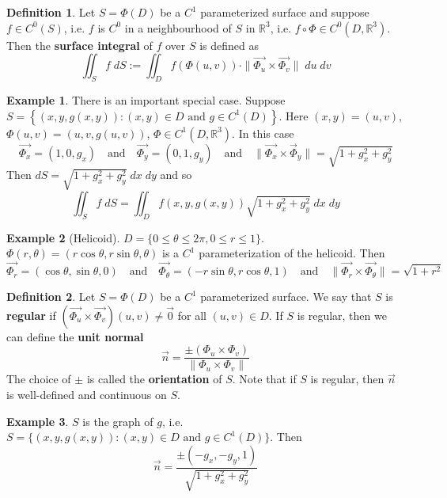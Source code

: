 \documentclass[11pt]{article}
\theoremstyle{definition}
\newtheorem{exmp}{Example}[section]
\theoremstyle{definition}
\newcommand{\R}[0]{\mathbb{R}}
\theoremstyle{definition}
\newtheorem{definition}{\textcolor{OliveGreen}{Definition}}
\theoremstyle{remark}
\begin{document}
\begin{definition}
    Let $S = \Phi(D)$ be a $C^1$ parameterized surface and suppose $f \in C^0(S)$, i.e. $f$ is $C^0$ in a neighbourhood of $S$ in $\R^3$, i.e. $f \circ \Phi \in C^0(D, \R^3)$.
    Then the \textbf{surface integral} of $f$ over $S$ is defined as
    \[
        \iint_S f \; dS := \iint_{D} f(\Phi(u,v)) \cdot \| \vec{\Phi_u} \times \vec{\Phi_v} \| \; du \; dv
    \]        
\end{definition}

\begin{exmp}
    There is an important special case. Suppose $S = \left\{ (x, y, g(x,y)) : (x,y) \in D \text{ and } g \in C^1(D) \right\} $.
    Here $(x,y) = (u,v)$, $\Phi(u,v) = (u, v, g(u,v))$, $\Phi \in C^1(D, \R^3)$. In this case
    \[
        \vec{\Phi_x} = (1, 0, g_x) \quad \text{and} \quad \vec{\Phi_y} = (0, 1, g_y) \quad \text{and} \quad \| \vec{\Phi_x} \times \vec{\Phi}_y \| = \sqrt{1 + g_x^2 + g_y^2} 
    \]    
    Then $dS = \sqrt{1 + g_x^2 + g_y^2} \; dx \; dy$ and so
    \[
        \iint_S f \; dS = \iint_D f(x, y, g(x,y)) \sqrt{1 + g_x^2 + g_y^2} \; dx \; dy
    \] 
\end{exmp}

\begin{exmp}[Helicoid]
    $D = \{0 \leq \theta \leq 2 \pi , 0 \leq r \leq 1\}$. $\Phi(r, \theta) = (r \cos \theta, r \sin \theta, \theta)$ is a $C^1$ parameterization of the helicoid. Then
    \[
        \vec{\Phi_r} = (\cos \theta, \sin \theta, 0) \quad \text{and} \quad \vec{\Phi_\theta} = (-r \sin \theta, r \cos \theta, 1) \quad \text{and} \quad \| \vec{\Phi_r} \times \vec{\Phi_\theta} \| = \sqrt{1 + r^2}
    \] 
\end{exmp}

\begin{definition}
    Let $S = \Phi(D)$ be a $C^1$ parameterized surface. We say that $S$ is \textbf{regular} if $(\vec{\Phi_u} \times \vec{\Phi_v})(u,v) \neq \vec{0}$ for all $(u,v) \in D$.
    If $S$ is regular, then we can define the \textbf{unit normal} 
    \[
        \vec{n} = \frac{\pm (\Phi_u \times \Phi_v)}{\|\Phi_u \times \Phi_v\|}
    \]  
    The choice of $\pm$ is called the \textbf{orientation} of $S$. Note that if $S$ is regular, then $\vec{n}$ is well-defined and continuous on $S$.
\end{definition}

\begin{exmp}
    $S$ is the graph of $g$, i.e. $S = \{(x, y, g(x,y)): (x,y) \in D \text{ and } g \in C^1(D) \}$. Then
    \[
        \vec{n} = \frac{\pm (-g_x, -g_y, 1)}{\sqrt{1 + g_x^2 + g_y^2}}
    \]
\end{exmp}
\end{document}
